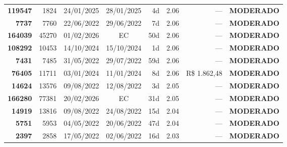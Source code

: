 \documentclass[a4paper,10pt]{article}
\begin{document}
\begin{center}
\begin{longtable}{>{\scriptsize}r>{\scriptsize}r>{\scriptsize}c>{\scriptsize}c>{\scriptsize}r>{\scriptsize}r>{\scriptsize}r>{\scriptsize}l}
\textcolor{anomyellow}{\textbf{119547}} & 1824 & 24/01/2025 & 28/01/2025 & 4d & \textcolor{anomyellow}{2.06} & --- & \textcolor{anomyellow}{\textbf{MODERADO}} \\

\textcolor{anomyellow}{\textbf{7737}} & 7760 & 22/06/2022 & 29/06/2022 & 7d & \textcolor{anomyellow}{2.06} & --- & \textcolor{anomyellow}{\textbf{MODERADO}} \\

\textcolor{anomyellow}{\textbf{164039}} & 45270 & 01/02/2026 & \textcolor{anomorange}{EC} & 50d & \textcolor{anomyellow}{2.06} & --- & \textcolor{anomyellow}{\textbf{MODERADO}} \\

\textcolor{anomyellow}{\textbf{108292}} & 10453 & 14/10/2024 & 15/10/2024 & 1d & \textcolor{anomyellow}{2.06} & --- & \textcolor{anomyellow}{\textbf{MODERADO}} \\

\textcolor{anomyellow}{\textbf{7431}} & 7485 & 31/05/2022 & 29/07/2022 & 59d & \textcolor{anomyellow}{2.06} & --- & \textcolor{anomyellow}{\textbf{MODERADO}} \\

\textcolor{anomyellow}{\textbf{76405}} & 11711 & 03/01/2024 & 11/01/2024 & 8d & \textcolor{anomyellow}{2.06} & R\$ 1.862,48 & \textcolor{anomyellow}{\textbf{MODERADO}} \\

\textcolor{anomyellow}{\textbf{14624}} & 13576 & 09/08/2022 & 12/08/2022 & 3d & \textcolor{anomyellow}{2.05} & --- & \textcolor{anomyellow}{\textbf{MODERADO}} \\

\textcolor{anomyellow}{\textbf{166280}} & 77381 & 20/02/2026 & \textcolor{anomorange}{EC} & 31d & \textcolor{anomyellow}{2.05} & --- & \textcolor{anomyellow}{\textbf{MODERADO}} \\

\textcolor{anomyellow}{\textbf{14919}} & 13816 & 09/08/2022 & 24/08/2022 & 15d & \textcolor{anomyellow}{2.04} & --- & \textcolor{anomyellow}{\textbf{MODERADO}} \\

\textcolor{anomyellow}{\textbf{5751}} & 5953 & 04/05/2022 & 20/06/2022 & 47d & \textcolor{anomyellow}{2.04} & --- & \textcolor{anomyellow}{\textbf{MODERADO}} \\

\textcolor{anomyellow}{\textbf{2397}} & 2858 & 17/05/2022 & 02/06/2022 & 16d & \textcolor{anomyellow}{2.03} & --- & \textcolor{anomyellow}{\textbf{MODERADO}} \\


\end{longtable}
\end{center}
\end{document}
